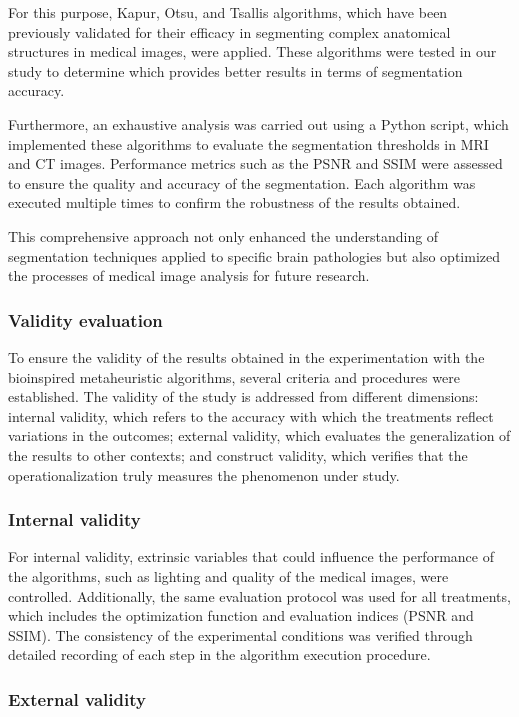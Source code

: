 \documentclass{elsarticle}
\begin{document}
For this purpose, Kapur, Otsu, and Tsallis algorithms, which have been previously validated for their efficacy in segmenting complex anatomical structures in medical images, were applied. These algorithms were tested in our study to determine which provides better results in terms of segmentation accuracy.

Furthermore, an exhaustive analysis was carried out using a Python script, which implemented these algorithms to evaluate the segmentation thresholds in MRI and CT images. Performance metrics such as the PSNR and SSIM were assessed to ensure the quality and accuracy of the segmentation. Each algorithm was executed multiple times to confirm the robustness of the results obtained.

This comprehensive approach not only enhanced the understanding of segmentation techniques applied to specific brain pathologies but also optimized the processes of medical image analysis for future research.

\subsubsection{Validity evaluation}

To ensure the validity of the results obtained in the experimentation with the bioinspired metaheuristic algorithms, several criteria and procedures were established. The validity of the study is addressed from different dimensions: internal validity, which refers to the accuracy with which the treatments reflect variations in the outcomes; external validity, which evaluates the generalization of the results to other contexts; and construct validity, which verifies that the operationalization truly measures the phenomenon under study.

\subsubsection{Internal validity}

For internal validity, extrinsic variables that could influence the performance of the algorithms, such as lighting and quality of the medical images, were controlled. Additionally, the same evaluation protocol was used for all treatments, which includes the optimization function and evaluation indices (PSNR and SSIM). The consistency of the experimental conditions was verified through detailed recording of each step in the algorithm execution procedure.

\subsubsection{External validity}
\end{document}
